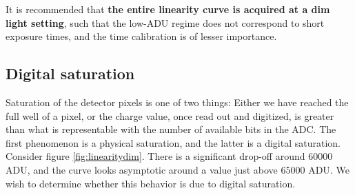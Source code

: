 \documentclass[../main.tex]{subfiles}
\begin{document}
		It is recommended that \textbf{the entire linearity curve is acquired at a dim light setting}, such that the low-ADU regime does not correspond to short exposure times, and the time calibration is of lesser importance. 
		
		
		\subsection{Digital saturation}\label{sect:digsat}
		Saturation of the detector pixels is one of two things: Either we have reached the full well of a pixel, or the charge value, once read out and digitized, is greater than what is representable with the number of available bits in the ADC. The first phenomenon is a physical saturation, and the latter is a digital saturation. Consider figure \ref{fig:linearitydim}. There is a significant drop-off around $60000$ ADU, and the curve looks asymptotic around a value just above $65000$ ADU. We wish to determine whether this behavior is due to digital saturation. 
		
\end{document}
